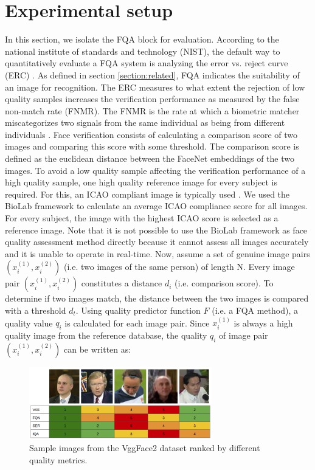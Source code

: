 \documentclass[letterpaper]{article} %
\begin{document}
\section{Experimental setup}
\label{section:experimental_setup}
In this section, we isolate the FQA block for evaluation. According to the national institute of standards and technology (NIST), the default way to quantitatively evaluate a FQA system is analyzing the error vs. reject curve (ERC) \cite{grother2007performance, grother2020ongoing}. As defined in section \ref{section:related}, FQA indicates the suitability of an image for recognition. The ERC measures to what extent the rejection of low quality samples increases the verification performance as measured by the false non-match rate (FNMR). The FNMR is the rate at which a biometric matcher miscategorizes two signals from the same individual as being from different individuals \cite{Schuckers2010}. Face verification consists of calculating a comparison score of two images and comparing this score with some threshold. The comparison score is defined as the euclidean distance between the FaceNet \cite{schroff2015facenet} embeddings of the two images. To avoid a low quality sample affecting the verification performance of a high quality sample, one high quality reference image for every subject is required. For this, an ICAO compliant image is typically used \cite{hernandez2020biometric}. We used the BioLab framework \cite{ferrara2012face} to calculate an average ICAO compliance score for all images. For every subject,  the image with the highest ICAO score is selected as a reference image. Note that it is not possible to use the BioLab framework as face quality assessment method directly because it cannot assess all images accurately and it is unable to operate in real-time. Now, assume a set of genuine image pairs $(x_i^{(1)}, x_i^{(2)})$ (i.e. two images of the same person) of length N. Every image pair $(x_i^{(1)}, x_i^{(2)})$ constitutes a distance $d_i$ (i.e. comparison score). To determine if two images match, the distance between the two images is compared with a threshold $d_t$. Using quality predictor function $F$ (i.e. a FQA method), a quality value $q_i$ is calculated for each image pair. Since $x_i^{(1)}$ is always a high quality image from the reference database, the quality $q_i$ of image pair $(x_i^{(1)}, x_i^{(2)})$ can be written as:
\begin{figure}[t]
    \centering
    \includegraphics[width=225pt]{figures/example.png}
    \caption{Sample images from the VggFace2 dataset ranked by different quality metrics.}
    \label{fig:example_images}
\end{figure}
\end{document}
